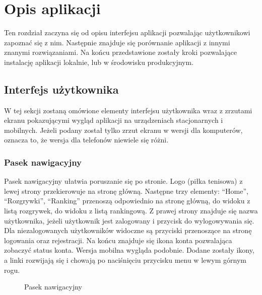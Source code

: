 \documentclass[shortabstract]{iithesis}
\begin{document}
\chapter{Opis aplikacji}
Ten rozdział zaczyna się od opisu interfejsu aplikacji pozwalając użytkownikowi zapoznać się z nim.
Następnie znajduje się porównanie aplikacji z innymi znanymi rozwiązaniami.
Na końcu przedstawione zostały kroki pozwalające instalację aplikacji lokalnie, lub w środowisku produkcyjnym.
\section{Interfejs użytkownika}
W tej sekcji zostaną omówione elementy interfejsu użytkownika wraz z zrzutami ekranu pokazującymi wygląd aplikacji na urządzeniach stacjonarnych i mobilnych.
Jeżeli podany został tylko zrzut ekranu w wersji dla komputerów, oznacza to, że wersja dla telefonów niewiele się różni.
\subsection{Pasek nawigacyjny}
Pasek nawigacyjny ułatwia poruszanie się po stronie. Logo (piłka tenisowa) z lewej strony przekierowuje na stronę główną.
Następne trzy elementy: ``Home'', ``Rozgrywki'', ``Ranking'' przenoszą odpowiednio na stronę główną, do widoku z listą rozgrywek, do widoku z listą rankingową.
Z prawej strony znajduje się nazwa użytkownika, jeżeli użytkownik jest zalogowany i przycisk do wylogowywania się.
Dla niezalogowanych użytkowników widoczne są przyciski przenoszące na stronę logowania oraz rejestracji.
Na końcu znajduje się ikona konta pozwalająca zobaczyć status konta. Wersja mobilna wygląda podobnie. 
Dodane zostały ikony, a linki rozwijają się i chowają po naciśnięciu przycisku menu w lewym górnym rogu.

\begin{figure}[H]
    \centering
    \hfill
    \caption{Pasek nawigacyjny}
\end{figure}
\end{document}
